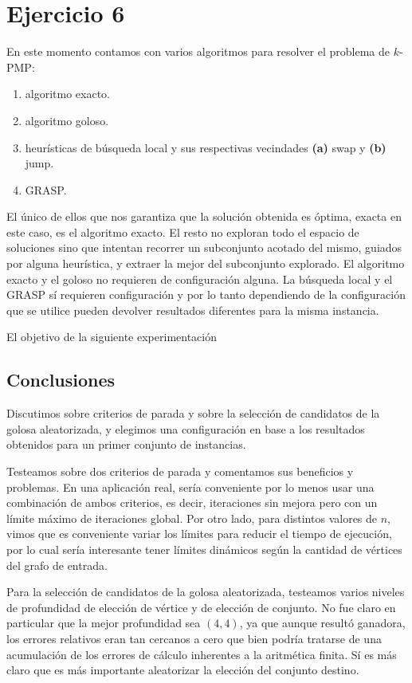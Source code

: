 \section{Ejercicio 6} 

En este momento contamos con varios algoritmos para resolver el problema de $k$-PMP:
\begin{enumerate}
  \item algoritmo exacto.
  \item algoritmo goloso.
  \item heurísticas de búsqueda local y sus respectivas vecindades \textbf{(a)} swap y \textbf{(b)} jump.
  \item GRASP.
\end{enumerate}
El único de ellos que nos garantiza que la solución obtenida es óptima, exacta en este caso, es el algoritmo exacto.
El resto no exploran todo el espacio de soluciones sino que intentan recorrer un subconjunto acotado del mismo,
guiados por alguna heurística, y extraer la mejor del subconjunto explorado. El algoritmo exacto y el goloso
no requieren de configuración alguna. La búsqueda local y el GRASP sí requieren configuración y por lo tanto
dependiendo de la configuración que se utilice pueden devolver resultados diferentes para la misma instancia.

El objetivo de la siguiente experimentación 

\subsection{Conclusiones}

Discutimos sobre criterios de parada y sobre la selección de candidatos de la golosa aleatorizada, y elegimos una configuración en base a los resultados obtenidos para un primer conjunto de instancias.

Testeamos sobre dos criterios de parada y comentamos sus beneficios y problemas. En una aplicación real, sería conveniente por lo menos usar una combinación de ambos criterios, es decir, iteraciones sin mejora pero con un límite máximo de iteraciones global. Por otro lado, para distintos valores de $n$, vimos que es conveniente variar los límites para reducir el tiempo de ejecución, por lo cual sería interesante tener límites dinámicos según la cantidad de vértices del grafo de entrada.

Para la selección de candidatos de la golosa aleatorizada, testeamos varios niveles de profundidad de elección de vértice y de elección de conjunto. No fue claro en particular que la mejor profundidad sea $(4,4)$, ya que aunque resultó ganadora, los errores relativos eran tan cercanos a cero que bien podría tratarse de una acumulación de los errores de cálculo inherentes a la aritmética finita. Sí es más claro que es más importante aleatorizar la elección del conjunto destino.

